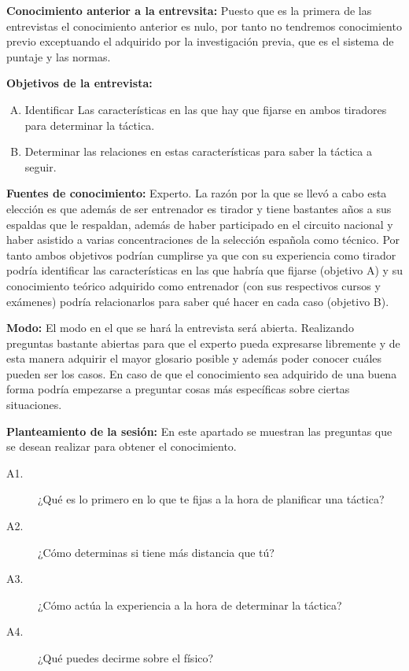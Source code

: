 \textbf{Conocimiento anterior a la entrevsita:} Puesto que es la primera de las entrevistas el conocimiento anterior es nulo, por tanto no
tendremos conocimiento previo exceptuando el adquirido por la investigación previa, que es el
sistema de puntaje y las normas.

\textbf{Objetivos de la entrevista:}
  \begin{enumerate}[(A)]
    \item Identificar Las características en las que hay que fijarse
     en ambos tiradores para determinar la táctica.
    \item Determinar las relaciones en estas características para saber la táctica a seguir.
  \end{enumerate}

\textbf{Fuentes de conocimiento:} Experto.
La razón por la que se llevó a cabo esta elección es que además de ser entrenador es tirador y
tiene bastantes años a sus espaldas que le respaldan, además de haber participado en el circuito
nacional y haber asistido a varias concentraciones de la selección española como técnico. Por
tanto ambos objetivos podrían cumplirse ya que con su experiencia como tirador podría
identificar las características en las que habría que fijarse (objetivo A) y su conocimiento teórico
adquirido como entrenador (con sus respectivos cursos y exámenes) podría relacionarlos para
saber qué hacer en cada caso (objetivo B).

\textbf{Modo:} El modo en el que se hará la entrevista será abierta. Realizando preguntas bastante abiertas
para que el experto pueda expresarse libremente y de esta manera adquirir el mayor glosario
posible y además poder conocer cuáles pueden ser los casos. En caso de que el conocimiento
sea adquirido de una buena forma podría empezarse a preguntar cosas más específicas sobre
ciertas situaciones.

\textbf{Planteamiento de la sesión:} En este apartado se muestran las preguntas que se desean
 realizar para obtener el conocimiento.

\begin{description}
  \item [A1.] ¿Qué es lo primero en lo que te fijas a la hora de planificar una táctica?
  \item [A2.] ¿Cómo determinas si tiene más distancia que tú?
  \item [A3.] ¿Cómo actúa la experiencia a la hora de determinar la táctica?
  \item [A4.] ¿Qué puedes decirme sobre el físico?
\end{description}

